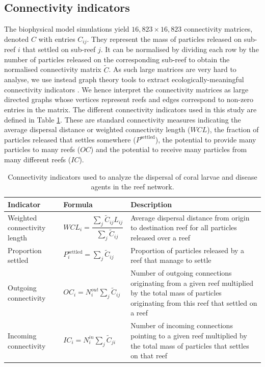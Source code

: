 \documentclass[fleqn,10pt]{wlscirep}
\begin{document}
\subsection{Connectivity indicators}
The biophysical model simulations yield $16,823 \times 16,823$ connectivity matrices, denoted $C$ with entries $C_{ij}$. They represent the mass of particles released on sub-reef $i$ that settled on sub-reef $j$. It can be normalised by dividing each row by the number of particles released on the corresponding sub-reef to obtain the normalised connectivity matrix $\tilde{C}$. As such large matrices are very hard to analyse, we use instead graph theory tools to extract ecologically-meaningful connectivity indicators \citep{Thomas2014Jan,Frys2020,Figueiredo2022Jan}. We hence interpret the connectivity matrices as large directed graphs whose vertices represent reefs and edges correspond to non-zero entries in the matrix. The different connectivity indicators used in this study are defined in Table \ref{tab:indicators}. These are standard connectivity measures indicating the average dispersal distance or weighted connectivity length ($WCL$), the fraction of particles released that settles somewhere ($P^\text{settled}$), the potential to provide many particles to many reefs ($OC$) and the potential to receive many particles from many different reefs ($IC$).

\begin{table}
    \centering
    \begin{tabular}{p{}p{}p{}}
         \hline
         \textbf{Indicator} & \textbf{Formula} & \textbf{Description} \\
         \hline
         Weighted connectivity length  & $WCL_{i} = \dfrac{\sum_{j} \tilde{C}_{ij} L_{ij}}{\sum_{j} \tilde{C}_{ij}}$ & Average dispersal distance from origin to destination reef for all particles released over a reef  \\
         Proportion settled & $P^\text{settled}_{i} = \sum_{j} \tilde{C}_{ij}$ & Proportion of particles released by a reef that manage to settle \\
         Outgoing connectivity & $OC_{i} = N_{i}^{out} \sum_{j} \tilde{C}_{ij}$ & Number of outgoing connections originating from a given reef multiplied by the total mass of particles originating from this reef that settled on a reef \\
         Incoming connectivity & $IC_{i} = N_{i}^{in} \sum_{j} \tilde{C}_{ji}$ &  Number of incoming connections pointing to a given reef multiplied by the total mass of particles that settles on that reef\\
         \hline
    \end{tabular}
    \caption{Connectivity indicators used to analyze the dispersal of coral larvae and disease agents in the reef network.}
    \label{tab:indicators}
\end{table}
\end{document}
